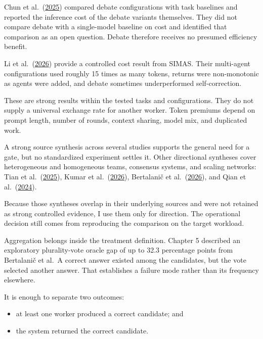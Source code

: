 Chun et al.~(\href{https://arxiv.org/abs/2503.12029}{2025}) compared debate configurations with task baselines and reported the inference cost of the debate variants themselves. They did not compare debate with a single-model baseline on cost and identified that comparison as an open question. Debate therefore receives no presumed efficiency benefit.

Li et al.~(\href{https://arxiv.org/abs/2606.00655}{2026}) provide a controlled cost result from SIMAS. Their multi-agent configurations used roughly 15 times as many tokens, returns were non-monotonic as agents were added, and debate sometimes underperformed self-correction.

These are strong results within the tested tasks and configurations. They do not supply a universal exchange rate for another worker. Token premiums depend on prompt length, number of rounds, context sharing, model mix, and duplicated work.

A strong source synthesis across several studies supports the general need for a gate, but no standardized experiment settles it. Other directional syntheses cover heterogeneous and homogeneous teams, consensus systems, and scaling networks: Tian et al.~(\href{https://arxiv.org/abs/2509.23537}{2025}), Kumar et al.~(\href{https://arxiv.org/abs/2604.13120}{2026}), Bertalani\v{c} et al.~(\href{https://arxiv.org/abs/2605.00914}{2026}), and Qian et al.~(\href{https://arxiv.org/abs/2406.07155}{2024}).

Because those syntheses overlap in their underlying sources and were not retained as strong controlled evidence, I use them only for direction. The operational decision still comes from reproducing the comparison on the target workload.

Aggregation belongs inside the treatment definition. Chapter 5 described an exploratory plurality-vote oracle gap of up to 32.3 percentage points from Bertalani\v{c} et al.~A correct answer existed among the candidates, but the vote selected another answer. That establishes a failure mode rather than its frequency elsewhere.


It is enough to separate two outcomes:

\begin{itemize}
\tightlist
\item
  at least one worker produced a correct candidate; and
\item
  the system returned the correct candidate.
\end{itemize}

